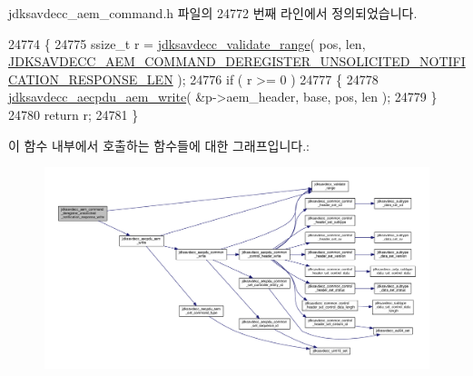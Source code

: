 jdksavdecc\+\_\+aem\+\_\+command.\+h 파일의 24772 번째 라인에서 정의되었습니다.


\begin{DoxyCode}
24774 \{
24775     ssize\_t r = \hyperlink{group__util_ga9c02bdfe76c69163647c3196db7a73a1}{jdksavdecc\_validate\_range}( pos, len, 
      \hyperlink{group__command__deregister__unsolicited__notification__response_ga6b1095fb900d4ad3d966caa72cde2dca}{JDKSAVDECC\_AEM\_COMMAND\_DEREGISTER\_UNSOLICITED\_NOTIFICATION\_RESPONSE\_LEN}
       );
24776     \textcolor{keywordflow}{if} ( r >= 0 )
24777     \{
24778         \hyperlink{group__aecpdu__aem_gad658e55771cce77cecf7aae91e1dcbc5}{jdksavdecc\_aecpdu\_aem\_write}( &p->aem\_header, base, pos, len );
24779     \}
24780     \textcolor{keywordflow}{return} r;
24781 \}
\end{DoxyCode}


이 함수 내부에서 호출하는 함수들에 대한 그래프입니다.\+:
\nopagebreak
\begin{figure}[H]
\begin{center}
\leavevmode
\includegraphics[width=350pt]{group__command__deregister__unsolicited__notification__response_gae7818363cce6c098be40819270e9f084_cgraph}
\end{center}
\end{figure}


